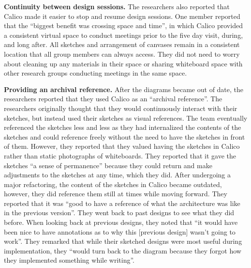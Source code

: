 
\textbf{Continuity between design sessions.} The researchers also reported that Calico made it easier to stop and resume design sessions. One member reported that the ``biggest benefit was crossing space and time'', in which Calico provided a consistent virtual space to conduct meetings prior to the five day visit, during, and long after. All sketches and arrangement of canvases remain in a consistent location that all group members can always access. They did not need to worry about cleaning up any materials in their space or sharing whiteboard space with other research groups conducting meetings in the same space. 


\textbf{Providing an archival reference.} After the diagrams became out of date, the researchers reported that they used Calico as an ``archival reference''. The researchers originally thought that they would continuously interact with their sketches, but instead used their sketches as visual references. The team eventually referenced the sketches less and less as they had internalized the contents of the sketches and could reference freely without the need to have the sketches in front of them. However, they reported that they valued having the sketches in Calico rather than static photographs of whiteboards. They reported that it gave the sketches ``a sense of permanence'' because they could return and make adjustments to the sketches at any time, which they did. After undergoing a major refactoring, the content of the sketches in Calico became outdated, however, they did reference them still at times while moving forward. They reported that it was ``good to have a reference of what the architecture was like in the previous version''. They went back to past designs to see what they did before. When looking back at previous designs, they noted that ``it would have been nice to have annotations as to why this [previous design] wasn't going to work''. They remarked that while their sketched designs were most useful during implementation, they ``would turn back to the diagram because they forgot how they implemented something while writing''.

